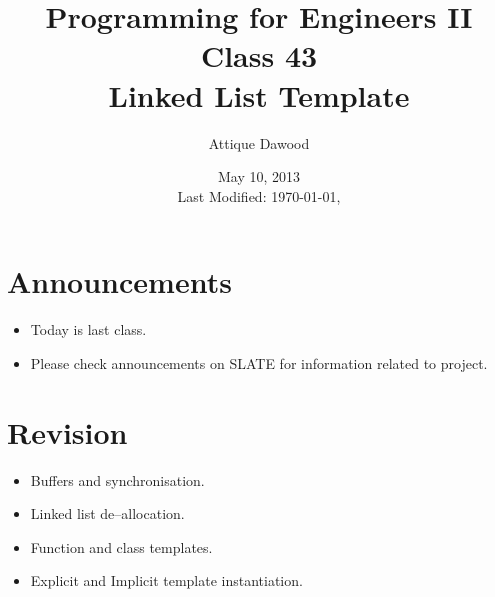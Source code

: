 \documentclass[12pt,a4paper]{article}
\title{\vspace{-2cm}Programming for Engineers II\\Class 43\\Linked List Template}
\author{Attique Dawood}
\date{May 10, 2013\\[0.2cm] Last Modified: \today, \currenttime}
\begin{document}
\maketitle
\section{Announcements}
\begin{itemize}
\item Today is last class.
\item Please check announcements on SLATE for information related to project.
\end{itemize}
\section{Revision}
\begin{itemize}
\item Buffers and synchronisation.
\item Linked list de--allocation.
\item Function and class templates.
\item Explicit and Implicit template instantiation.
\end{itemize}
\end{document}
